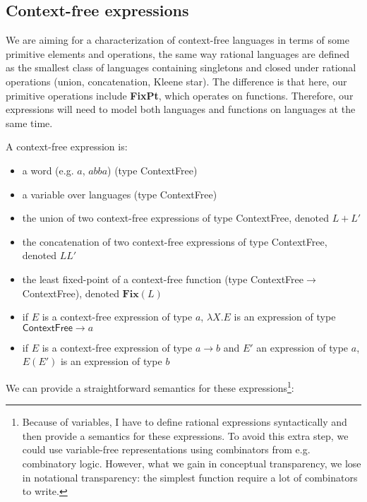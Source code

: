 \subsection{Context-free expressions}

We are aiming for a characterization of context-free languages in terms of some primitive elements and operations, the same way rational languages are defined as the smallest class of languages containing singletons and closed under rational operations (union, concatenation, Kleene star). The difference is that here, our primitive operations include \textbf{FixPt}, which operates on functions. Therefore, our expressions will need to model both languages and functions on languages at the same time.

\begin{definition}
A context-free expression is:
\begin{itemize}
\item a word (e.g. $a$, $abba$) (type \textsf{ContextFree})
\item a variable over languages (type \textsf{ContextFree})
\item the union of two context-free expressions of type \textsf{ContextFree},  denoted $L + L'$
\item the concatenation of two context-free expressions of type \textsf{ContextFree}, denoted $LL'$
\item the least fixed-point of a context-free function (type \textsf{ContextFree}$\rightarrow$\textsf{ContextFree}), denoted $\mathbf{Fix}(L)$
\item if $E$ is a context-free expression of type $a$, $\lambda X. E$ is an expression of type $\textsf{ContextFree}\rightarrow a$
\item if $E$ is a context-free expression of type $a\rightarrow b$ and $E'$ an expression of type $a$, $E(E')$ is an expression of type $b$
\end{itemize}
\end{definition}

We can provide a straightforward semantics for these expressions\footnote{Because of variables, I have to define rational expressions syntactically and then provide a semantics for these expressions. To avoid this extra step, we could use variable-free representations using combinators from e.g. combinatory logic. However, what we gain in conceptual transparency, we lose in notational transparency: the simplest function require a lot of combinators to write.}:

